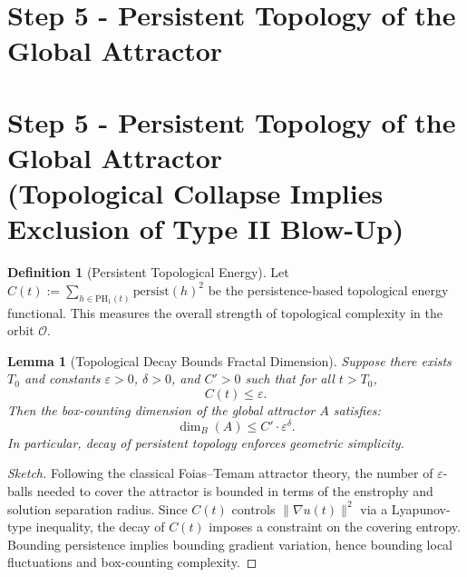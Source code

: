 \documentclass[11pt]{article}
\newtheorem{lemma}[theorem]{Lemma}
\theoremstyle{definition}
\newtheorem{definition}[theorem]{Definition}
\begin{document}
\section{Step 5 - Persistent Topology of the Global Attractor}
\label{sec:step5}


\section{Step 5 - Persistent Topology of the Global Attractor\\
\small (Topological Collapse Implies Exclusion of Type II Blow-Up)}
\label{sec:step5}

\begin{definition}[Persistent Topological Energy]
Let $C(t) := \sum_{h \in \mathrm{PH}_1(t)} \mathrm{persist}(h)^2$ be the persistence-based topological energy functional. This measures the overall strength of topological complexity in the orbit $\mathcal{O}$.
\end{definition}

\begin{lemma}[Topological Decay Bounds Fractal Dimension]
\label{lem:fractal-dim-bound}
Suppose there exists $T_0$ and constants $\varepsilon > 0$, $\delta > 0$, and $C' > 0$ such that for all $t > T_0$,
\[
C(t) \le \varepsilon.
\]
Then the box-counting dimension of the global attractor $A$ satisfies:
\[
\dim_B(A) \le C' \cdot \varepsilon^{\delta}.
\]
In particular, decay of persistent topology enforces geometric simplicity.
\end{lemma}

\begin{proof}[Sketch]
Following the classical Foias–Temam attractor theory, the number of $\varepsilon$-balls needed to cover the attractor is bounded in terms of the enstrophy and solution separation radius. Since $C(t)$ controls $\|\nabla u(t)\|^2$ via a Lyapunov-type inequality, the decay of $C(t)$ imposes a constraint on the covering entropy. Bounding persistence implies bounding gradient variation, hence bounding local fluctuations and box-counting complexity.
\end{proof}
\end{document}
